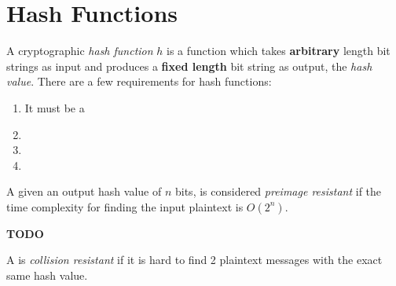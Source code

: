 \section{Hash Functions}\label{sec:Hash_Functions}
\begin{definition}\label{def:Hash_Function}
  A cryptographic \emph{hash function} $h$ is a function which takes \textbf{arbitrary} length bit strings as input and produces a \textbf{fixed length} bit string as output, the \emph{hash value}.
  There are a few requirements for hash functions:
  \begin{enumerate}[noitemsep]
  \item It must be a 
  \item {}
  \item {}
  \item {}
  \end{enumerate}
\end{definition}

\begin{definition}\label{def:Preimage_Resistant}
  A  given an output hash value of $n$ bits, is considered \emph{preimage resistant} if the time complexity for finding the input plaintext is $O(2^{n})$.
\end{definition}

\begin{definition}\label{def:Second_Preimage_Resistant}
  \textbf{TODO}
\end{definition}

\begin{definition}\label{def:Collision_Resistant}
  A  is \emph{collision resistant} if it is hard to find 2 plaintext messages with the exact same hash value.
\end{definition}

